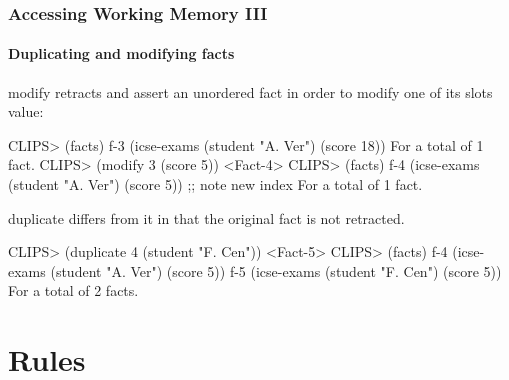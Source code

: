 \documentclass[xcolor={usenames,dvipsnames,svgnames}, compress]{beamer}
\begin{document}
\begin{frame}[fragile]
  \frametitle{Accessing Working Memory III}
  \framesubtitle{Duplicating and modifying facts}
  
  \textsf{modify} retracts and assert an unordered fact in order to modify one
  of its slots value:
  \begin{clips-code}
    CLIPS> (facts)
    f-3     (icse-exams (student "A. Ver") (score 18))
    For a total of 1 fact.
    CLIPS> (modify 3 (score 5))
    <Fact-4>
    CLIPS> (facts)
    f-4     (icse-exams (student "A. Ver") (score 5)) ;; note new index
    For a total of 1 fact.
  \end{clips-code}
  
  \textsf{duplicate} differs from it in that the original fact is not
  retracted.
  \begin{clips-code}[firstnumber=9]
    CLIPS> (duplicate 4 (student "F. Cen"))
    <Fact-5>
    CLIPS> (facts)
    f-4     (icse-exams (student "A. Ver") (score 5))
    f-5     (icse-exams (student "F. Cen") (score 5))
    For a total of 2 facts.
  \end{clips-code}
\end{frame}


  




\section{Rules}
{
  \begin{frame}
    \sectionpage
  \end{frame}
}
\end{document}
